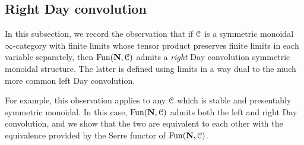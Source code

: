 \documentclass[oneside,a4paper]{amsart}
\begin{document}
\subsection{Right Day convolution}

In this subsection, we record the observation that if $\EuScript{C}$ is a symmetric monoidal $\infty$-category with finite limits whose tensor product preserves finite limits in each variable separately, then $\mathrm{Fun}(\mathbf{N}, \EuScript{C})$ admits a \emph{right} Day convolution symmetric monoidal structure. The latter is defined using limits in a way dual to the much more common left Day convolution. 

For example, this observation applies to any $\EuScript{C}$ which is stable and presentably symmetric monoidal. In this case, $\mathrm{Fun}(\mathbf{N}, \EuScript{C})$ admits both the left and right Day convolution, and we show that the two are equivalent to each other with the equivalence provided by the Serre functor of $\mathrm{Fun}(\mathbf{N}, \EuScript{C})$. 
\end{document}
